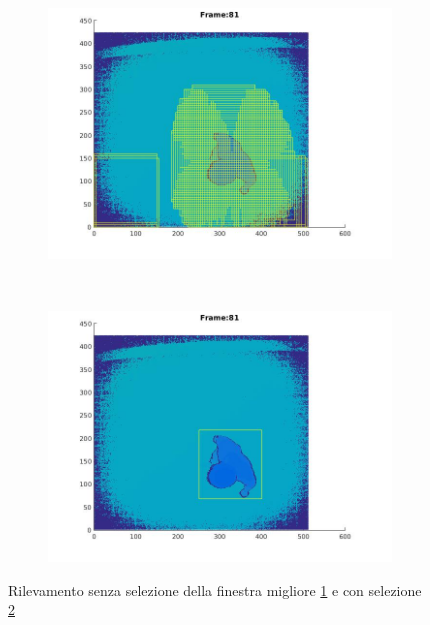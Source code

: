         \begin{figure}[h]
            \centering
            \begin{subfigure}[b]{0.48\textwidth}
                \includegraphics[width=\textwidth]{img/detection_without_selection.jpg}
                \caption{}
                \label{fig:detection_without_selection}
            \end{subfigure}
            ~ %
            \begin{subfigure}[b]{0.48\textwidth}
                \includegraphics[width=\textwidth]{img/detection_with_selection.jpg}
                \caption{}
                \label{fig:detection_with_selection}
            \end{subfigure}
            \caption{Rilevamento senza selezione della finestra migliore \ref{fig:detection_without_selection} e con selezione \ref{fig:detection_with_selection}}
            \label{fig:detection}
        \end{figure}

